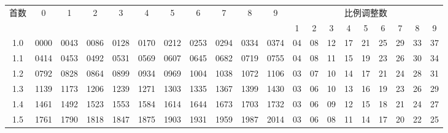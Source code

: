 \documentclass[12pt,UTF8,fontset=none]{ctexbook}
\begin{document}
\begin{appendix}
\begin{longtable}{|c| c c c c c | c c c c c| c c c c c c c c c|}
\toprule
\multirow{2}{*}{首数} & \multirow{2}{*}{0} & \multirow{2}{*}{1} & \multirow{2}{*}{2} & \multirow{2}{*}{3} & \multirow{2}{*}{4} & \multirow{2}{*}{5} & \multirow{2}{*}{6} & \multirow{2}{*}{7} & \multirow{2}{*}{8} & \multirow{2}{*}{9} & \multicolumn{9}{c}{\phantom{啊w}比例调整数\phantom{啊w}} \\
\cline{12-20}
 &  &  &  &  &  &  &  &  &  &  & 1 & 2 & 3 & 4 & 5 & 6 & 7 & 8 & 9 \\
\midrule
\endhead
\scriptsize 1.0 & \scriptsize 0000 & \scriptsize 0043 & \scriptsize 0086 & \scriptsize 0128 & \scriptsize 0170 & \scriptsize 0212 & \scriptsize 0253 & \scriptsize 0294 & \scriptsize 0334 & \scriptsize 0374 & \scriptsize 04 & \scriptsize 08 & \scriptsize 12 & \scriptsize 17 & \scriptsize 21 & \scriptsize 25 & \scriptsize 29 & \scriptsize 33 & \scriptsize 37 \\
\scriptsize 1.1 & \scriptsize 0414 & \scriptsize 0453 & \scriptsize 0492 & \scriptsize 0531 & \scriptsize 0569 & \scriptsize 0607 & \scriptsize 0645 & \scriptsize 0682 & \scriptsize 0719 & \scriptsize 0755 & \scriptsize 04 & \scriptsize 08 & \scriptsize 11 & \scriptsize 15 & \scriptsize 19 & \scriptsize 23 & \scriptsize 26 & \scriptsize 30 & \scriptsize 34 \\
\scriptsize 1.2 & \scriptsize 0792 & \scriptsize 0828 & \scriptsize 0864 & \scriptsize 0899 & \scriptsize 0934 & \scriptsize 0969 & \scriptsize 1004 & \scriptsize 1038 & \scriptsize 1072 & \scriptsize 1106 & \scriptsize 03 & \scriptsize 07 & \scriptsize 10 & \scriptsize 14 & \scriptsize 17 & \scriptsize 21 & \scriptsize 24 & \scriptsize 28 & \scriptsize 31 \\
\scriptsize 1.3 & \scriptsize 1139 & \scriptsize 1173 & \scriptsize 1206 & \scriptsize 1239 & \scriptsize 1271 & \scriptsize 1303 & \scriptsize 1335 & \scriptsize 1367 & \scriptsize 1399 & \scriptsize 1430 & \scriptsize 03 & \scriptsize 06 & \scriptsize 10 & \scriptsize 13 & \scriptsize 16 & \scriptsize 19 & \scriptsize 23 & \scriptsize 26 & \scriptsize 29 \\
\scriptsize 1.4 & \scriptsize 1461 & \scriptsize 1492 & \scriptsize 1523 & \scriptsize 1553 & \scriptsize 1584 & \scriptsize 1614 & \scriptsize 1644 & \scriptsize 1673 & \scriptsize 1703 & \scriptsize 1732 & \scriptsize 03 & \scriptsize 06 & \scriptsize 09 & \scriptsize 12 & \scriptsize 15 & \scriptsize 18 & \scriptsize 21 & \scriptsize 24 & \scriptsize 27 \\
\scriptsize 1.5 & \scriptsize 1761 & \scriptsize 1790 & \scriptsize 1818 & \scriptsize 1847 & \scriptsize 1875 & \scriptsize 1903 & \scriptsize 1931 & \scriptsize 1959 & \scriptsize 1987 & \scriptsize 2014 & \scriptsize 03 & \scriptsize 06 & \scriptsize 08 & \scriptsize 11 & \scriptsize 14 & \scriptsize 17 & \scriptsize 20 & \scriptsize 22 & \scriptsize 25 \\

\end{longtable}
\end{appendix}
\end{document}
